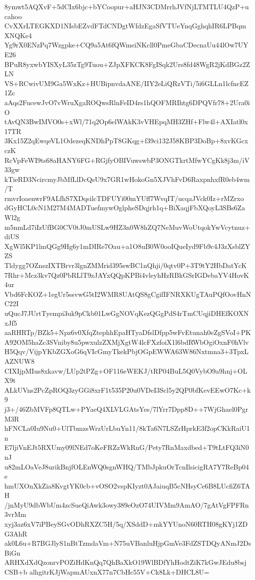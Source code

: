 8ymwt5AQXvF+5dCIx6bjc+bYCoopur+aHJN3CDMrrhJVfNjLTMTLU4QzP+ucahoo
CvXXrLTEGKXD1NIsbEZvdFTdCNDgtWfdzEgaSfVTUeYnqGghqhIR6LPBqmXNQKe4
Yg9rX0ENzPq7Wzgpke+CQ9a5At6fQWmeiNKcll0PmeGbaCDecnaUu44lOw7UYE26
BPuR8yxwbYISXyL35zTg9Tuou+ZJpXFKCK8FgISqk2Urs8fd48WgR2jKdBGz2ZLN
VS+RCwivUM9Ga5WxKz+HUBipnvdaANE/IIY2eLiQRzVTi/5i6GLLn1lcfncEZ1Zc
aAqs2FucewJvO7vWruXgaROQwsRlnFeID4rs1hQOFMRIhtg6DPQVfr78+2Ura0iO
tAvQN3BwIMVO0s+xWl/71q2Op6elWAkK3vVHEpqMH3ZHf+Flw4l+AXIatl0x17TR
3Kx15Z2qEwqeVL1OdezeqKNDhPpT8GKqg+f39ci132J58KBP3DoBp+8xvKGcxczK
RcVpFeWI9ts68aHANY6FG+RGjfyOBIVuwswbP3ONGTkrtMfwYCgKk8j3m/iV33gw
kTieRD3NcircmyJbMfLlDcQsU9x7GR1wHokoGn5XJVhFvD6RaxpnhxfR0eb4wm/T
rmvrIoaenwrF9ALfhS7XDqsilcTDFUYi00mYUff7WvqIT/ucqaJVck0Iz+rMZrxo
dGyHCL0cN1M27M4MADTuefmywOglpheSDqjrh1q+BiXaqjFbXQoyL3SBs6ZaWl2g
m5nmLd7iIzUfBG0CV0tJ0mUSLw9HZ3n0W8hZQ7NeMuvWoUtqokYwVcytnuz+diUS
XgWl5KP1lmQGg9Hg6y1mDIRe7Oau+a1O8uB0W0ooIQueIyd9Fb9c4J3zXsblZYZS
Tldygg7OZnszIXTBrvr3lgnZMMrid395swBC1nQhji/0qtv0P+3T9tY2HbDatYcK
7Rhr+Mcz3kv7Qz0PbRLlT9zJAYxQQpKPBi4vleyhHzRBkGSrIGDebaYV4HovK4ur
Vbd6FcKOZ+1egUr5ssvwG5tI2WMR8UAtQS8gCgifIFNRXKUgTAuPQfOovHnNC22I
uQucJ7JUrtTyempi3uk9pCkb01LwGgNOVqKezQGgPdS4rTmCUqjiDHEfKOXNxJf5
aaRHRTp/BZk5+Npz6v0XfqZtephhEpaHTyaDfslDfpp5wFvEtunah0eZgSVoI+PK
A92OM5haZc3SVniby8u5pwxulzZXMjXgtW4lcFXzfoiX1l6bdRWbOgiOxnF0hVlv
H5Qqv/VijpYKbZGXoG6qVIcGmyTkekPbjOGpEWWA63W86Nxtmna3+3TpxLAZNUW8
CIXIjpMIus8xkavw/LUp2tPZg+OF116eWEKJ/tRP04BuL5Q0VybO9a9hnj+OLX9t
ALkUVns2PcZpROQ3zyGGi8xrF1t535P20u0VDeI3Scl5y2QP0bfKevEEwO7Kc+k9
j3+/46ZbMVFp8QTLw+PYaeQ4XLVLGAtsYes/7lYrr7Dpp8D++7WjGhael0PgrM3R
hFNCLa0Iu9Nu0+UlTbmzsWrzUrLbuYn11/8kTa6N7LSZrHprkE3f2opCKkRaiU1n
E7ljiVnEJt5RXUmy09lNEd7oKeFRZzWkRnG/Pety7RnMaxdbed+T9tLtFQ3iN0nJ
u82mLOaVeJ8urikBnjfOLEnWQ0sgnWHQ/TMbJpkuOrTcnIlsicigRA7Y7ReBp04e
hmUXOnXkZia8KvgtYK0cb+vOSO2vspKIyzt0AJaiuqB5cNHsyCe6B8LUcfiZ6TAH
/jnMyU9dbWbUm4zcSueQiAwk3owy389eOzO74UIVMm9AmAO/7gAtVgFPFRn3vrMm
xyj3az6xV7iPBeySGvODhRXZC5H/5q/XSddD+mkYYUnoN60RTH08gKYj1ZDG3AhR
ak0L6u+R7BGJlyS1nBtTzmdaVm+N75uVBanluHjpGmVe3FdZSTDQyANmJ2DsBiGn
ARHXdXdQzonrvPOZiHdKnQq7QhBaXkO19WlBDfYhHodtZiK7kGwJEdu8bsjCSB+b
alhgitrKJjWapmAUxnX77n7CbHc55V+Ck8Lk+DHCL8U=
